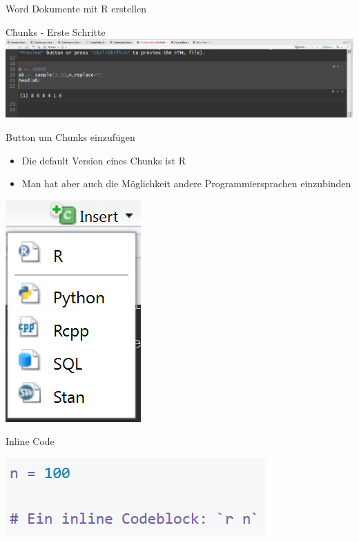 \documentclass[ignorenonframetext,]{beamer}
\providecommand{\tightlist}{%
\setlength{\itemsep}{0pt}\setlength{\parskip}{0pt}}
\begin{document}
\begin{frame}[fragile]{Word Dokumente mit R erstellen}
\begin{block}{Chunks - Erste Schritte}
\includegraphics{./tex2pdf.9796/973493b0437dbf133e9907d00ce10ce2f82855fb.png}

\end{block}

\begin{block}{Button um Chunks einzufügen}

\begin{itemize}
\tightlist
\item
  Die default Version eines Chunks ist R
\item
  Man hat aber auch die Möglichkeit andere Programmiersprachen
  einzubinden
\end{itemize}

\includegraphics{./tex2pdf.9796/0902c0c00b634dec607fe6bbda4246b93a04a77f.png}

\end{block}

\begin{block}{Inline Code}

\includegraphics{./tex2pdf.9796/ab6a014176cd5ec35bca9037d27a83e8e66fe337.png}


\end{block}
\end{frame}
\end{document}
